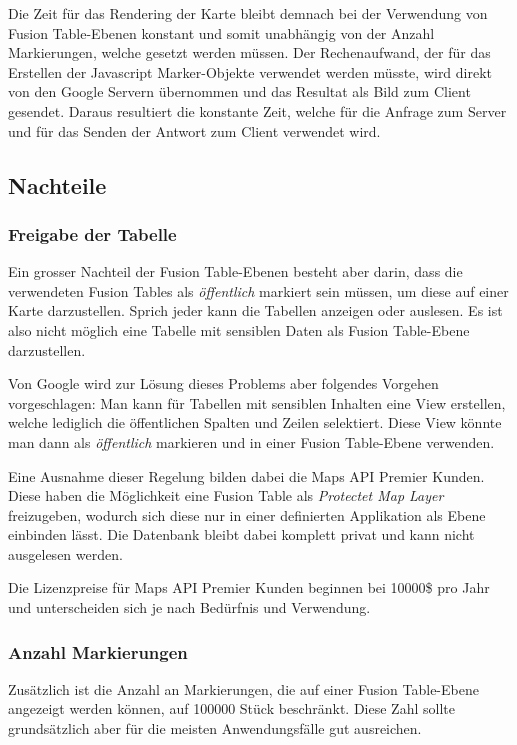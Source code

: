 Die Zeit für das Rendering der Karte bleibt demnach bei der Verwendung von Fusion Table-Ebenen konstant und somit unabhängig von der Anzahl Markierungen, welche gesetzt werden müssen. Der Rechenaufwand, der für das Erstellen der Javascript Marker-Objekte verwendet werden müsste, wird direkt von den Google Servern übernommen und das Resultat als Bild zum Client gesendet. Daraus resultiert die konstante Zeit, welche für die Anfrage zum Server und für das Senden der Antwort zum Client verwendet wird.

\subsection{Nachteile}
\subsubsection{Freigabe der Tabelle}
Ein grosser Nachteil der Fusion Table-Ebenen besteht aber darin, dass die verwendeten Fusion Tables als  \emph{öffentlich} markiert sein müssen, um diese auf einer Karte darzustellen. Sprich jeder kann die Tabellen anzeigen oder auslesen. Es ist also nicht möglich eine Tabelle mit sensiblen Daten als Fusion Table-Ebene darzustellen.

Von Google wird zur Lösung dieses Problems aber folgendes Vorgehen vorgeschlagen: Man kann für Tabellen mit sensiblen Inhalten eine View erstellen, welche lediglich die öffentlichen Spalten und Zeilen selektiert. Diese View könnte man dann als \emph{öffentlich} markieren und in einer Fusion Table-Ebene verwenden.

Eine Ausnahme dieser Regelung bilden dabei die Maps API Premier Kunden. Diese haben die Möglichkeit eine Fusion Table als \emph{Protectet Map Layer} freizugeben, wodurch sich diese nur in einer definierten Applikation als Ebene einbinden lässt. Die Datenbank bleibt dabei komplett privat und kann nicht ausgelesen werden.

Die Lizenzpreise für Maps API Premier Kunden beginnen bei 10000\$ pro Jahr und unterscheiden sich je nach Bedürfnis und Verwendung. 

\subsubsection{Anzahl Markierungen}
Zusätzlich ist die Anzahl an Markierungen, die auf einer Fusion Table-Ebene angezeigt werden können, auf 100000 Stück beschränkt. Diese Zahl sollte grundsätzlich aber für die meisten Anwendungsfälle gut ausreichen.

